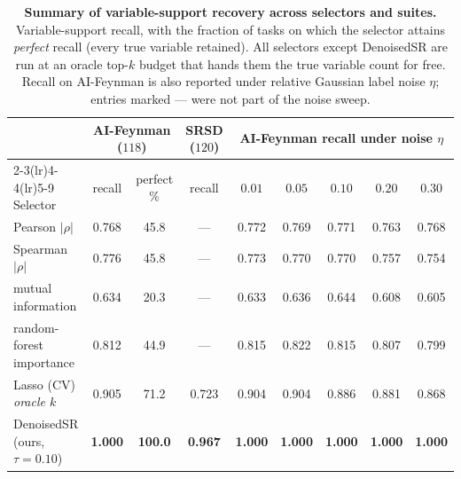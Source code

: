 \documentclass[11pt]{article}
\begin{document}
\begin{table}[h!]\centering
\caption{\textbf{Summary of variable-support recovery across selectors and
suites.} Variable-support recall, with the fraction of tasks on which the
selector attains \emph{perfect} recall (every true variable retained). All
selectors except DenoisedSR are run at an oracle top-$k$ budget that hands them
the true variable count for free. Recall on AI-Feynman is also reported under
relative Gaussian label noise $\eta$; entries marked --- were not part of the
noise sweep.}
\label{tab:selector-summary}
\footnotesize
\begin{tabular}{lcccccccc}
\toprule
& \multicolumn{2}{c}{AI-Feynman ($118$)} & SRSD ($120$) & \multicolumn{5}{c}{AI-Feynman recall under noise $\eta$} \\
\cmidrule(lr){2-3}\cmidrule(lr){4-4}\cmidrule(lr){5-9}
Selector & recall & perfect \% & recall & $0.01$ & $0.05$ & $0.10$ & $0.20$ & $0.30$ \\
\midrule
Pearson $|\rho|$           & 0.768 & 45.8 & ---   & 0.772 & 0.769 & 0.771 & 0.763 & 0.768 \\
Spearman $|\rho|$          & 0.776 & 45.8 & ---   & 0.773 & 0.770 & 0.770 & 0.757 & 0.754 \\
mutual information         & 0.634 & 20.3 & ---   & 0.633 & 0.636 & 0.644 & 0.608 & 0.605 \\
random-forest importance   & 0.812 & 44.9 & ---   & 0.815 & 0.822 & 0.815 & 0.807 & 0.799 \\
Lasso (CV) \emph{oracle $k$} & 0.905 & 71.2 & 0.723 & 0.904 & 0.904 & 0.886 & 0.881 & 0.868 \\
\midrule
DenoisedSR (ours, $\tau{=}0.10$) & \textbf{1.000} & \textbf{100.0} & \textbf{0.967} & \textbf{1.000} & \textbf{1.000} & \textbf{1.000} & \textbf{1.000} & \textbf{1.000} \\
\bottomrule
\end{tabular}
\end{table}
\end{document}
